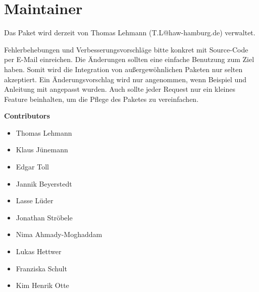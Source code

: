 %
\section{Maintainer}\label{sec:maintainer}
Das Paket wird derzeit von Thomas Lehmann (T.L@haw-hamburg.de) verwaltet.

Fehlerbehebungen und Verbesserungsvorschläge bitte konkret mit Source-Code per E-Mail einreichen. Die Änderungen sollten eine einfache Benutzung zum Ziel haben. Somit wird die Integration von außergewöhnlichen Paketen nur selten akzeptiert. Ein Änderungsvorschlag wird nur angenommen, wenn Beispiel und Anleitung mit angepasst wurden. Auch sollte jeder Request nur ein kleines Feature beinhalten, um die Pflege des Paketes zu vereinfachen.

\textbf{Contributors}
\begin{itemize}
\item Thomas Lehmann
\item Klaus Jünemann
\item Edgar Toll
\item Jannik Beyerstedt
\item Lasse Lüder
\item Jonathan Ströbele
\item Nima Ahmady-Moghaddam	
\item Lukas Hettwer
\item Franziska Schult
\item Kim Henrik Otte
\end{itemize}
